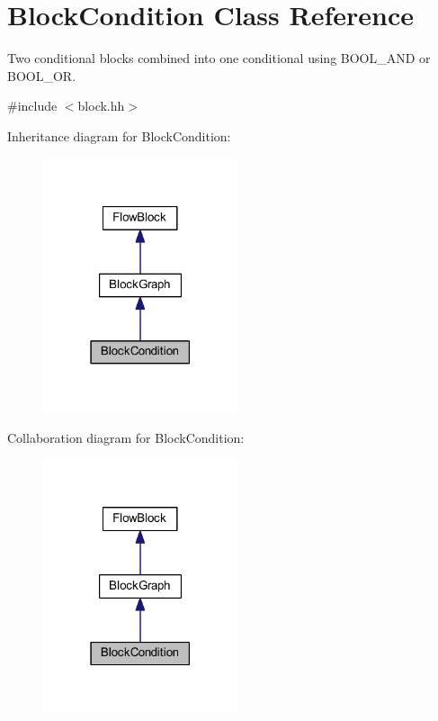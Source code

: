 \hypertarget{class_block_condition}{}\section{Block\+Condition Class Reference}
\label{class_block_condition}


Two conditional blocks combined into one conditional using B\+O\+O\+L\+\_\+\+A\+ND or B\+O\+O\+L\+\_\+\+OR.  




{\ttfamily \#include $<$block.\+hh$>$}



Inheritance diagram for Block\+Condition\+:
\nopagebreak
\begin{figure}[H]
\begin{center}
\leavevmode
\includegraphics[width=162pt]{class_block_condition__inherit__graph}
\end{center}
\end{figure}


Collaboration diagram for Block\+Condition\+:
\nopagebreak
\begin{figure}[H]
\begin{center}
\leavevmode
\includegraphics[width=162pt]{class_block_condition__coll__graph}
\end{center}
\end{figure}
